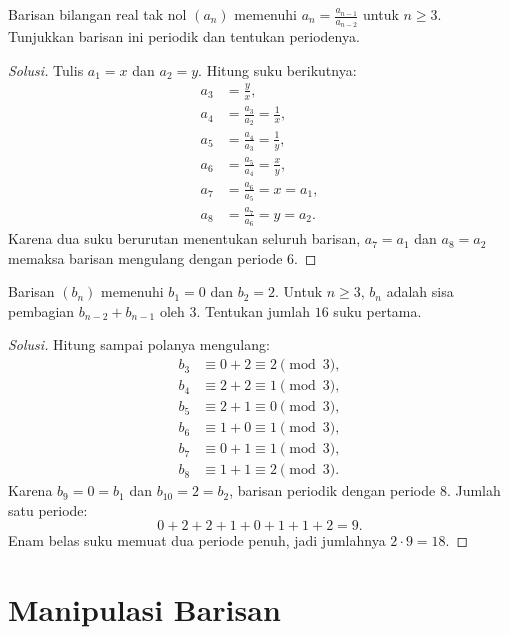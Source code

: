 \documentclass[12pt]{scrartcl}
\begin{document}
\begin{example}[Turki MO 2006]
Barisan bilangan real tak nol $(a_n)$ memenuhi $a_n = \frac{a_{n-1}}{a_{n-2}}$
untuk $n \ge 3$. Tunjukkan barisan ini periodik dan tentukan periodenya.
\end{example}
\begin{proof}[Solusi]
\renewcommand{\qedsymbol}{$\blacksquare$}
Tulis $a_1 = x$ dan $a_2 = y$. Hitung suku berikutnya:
\begin{align*}
a_3 &= \frac{y}{x}, \\
a_4 &= \frac{a_3}{a_2} = \frac{1}{x}, \\
a_5 &= \frac{a_4}{a_3} = \frac{1}{y}, \\
a_6 &= \frac{a_5}{a_4} = \frac{x}{y}, \\
a_7 &= \frac{a_6}{a_5} = x = a_1, \\
a_8 &= \frac{a_7}{a_6} = y = a_2.
\end{align*}
Karena dua suku berurutan menentukan seluruh barisan, $a_7 = a_1$ dan
$a_8 = a_2$ memaksa barisan mengulang dengan periode $6$.
\end{proof}

\begin{example}
Barisan $(b_n)$ memenuhi $b_1 = 0$ dan $b_2 = 2$. Untuk $n \ge 3$, $b_n$
adalah sisa pembagian $b_{n-2} + b_{n-1}$ oleh $3$. Tentukan jumlah $16$ suku pertama.
\end{example}
\begin{proof}[Solusi]
\renewcommand{\qedsymbol}{$\blacksquare$}
Hitung sampai polanya mengulang:
\begin{align*}
b_3 &\equiv 0 + 2 \equiv 2 \pmod{3}, \\
b_4 &\equiv 2 + 2 \equiv 1 \pmod{3}, \\
b_5 &\equiv 2 + 1 \equiv 0 \pmod{3}, \\
b_6 &\equiv 1 + 0 \equiv 1 \pmod{3}, \\
b_7 &\equiv 0 + 1 \equiv 1 \pmod{3}, \\
b_8 &\equiv 1 + 1 \equiv 2 \pmod{3}.
\end{align*}
Karena $b_9 = 0 = b_1$ dan $b_{10} = 2 = b_2$, barisan periodik dengan periode $8$.
Jumlah satu periode:
\[ 0 + 2 + 2 + 1 + 0 + 1 + 1 + 2 = 9. \]
Enam belas suku memuat dua periode penuh, jadi jumlahnya $2 \cdot 9 = 18$.
\end{proof}

\section{Manipulasi Barisan}
\end{document}
